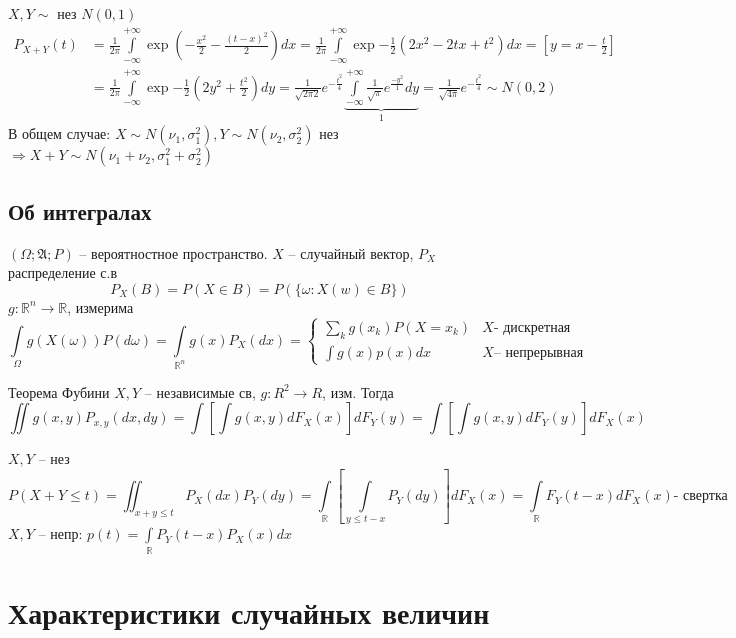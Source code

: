 \documentclass{article}
\newcommand{\A}{{\mathfrak A}}
\begin{document}
    \begin{example}
        $X, Y \sim $ нез $N(0, 1)$
        \begin{align*}
        P_{X+Y}(t) &= \frac{1}{2\pi} \int\limits_{-\infty}^{+\infty} \exp{(-\frac{x^2}{2} - \frac{(t-x)^2}{2})}dx = \frac{1}{2\pi} \int\limits_{-\infty}^{+\infty} \exp{-\frac{1}{2}(2x^2 - 2tx + t^2)}dx= \left[y = x - \frac{t}{2}\right] \\ &=\frac{1}{2\pi} \int\limits_{-\infty}^{+\infty} \exp{-\frac{1}{2} (2y^2 + \frac{t^2}{2})}dy = \frac{1}{\sqrt {2\pi 2}} e^{-\frac{t^2}{4}}  \underbrace{\int\limits_{-\infty}^{+\infty} \frac{1}{\sqrt\pi} e^\frac{-y ^2}{1} dy}_1 =\frac{1}{\sqrt {4\pi}} e^{-\frac{t^2}{4}} \sim N(0, 2)
        \end{align*}
        В общем случае:
        $X \sim N(\nu_1, \sigma_1^2), Y \sim N(\nu_2, \sigma_2^2)$ нез $ \Rightarrow X+Y \sim N(\nu_1 + \nu_2, \sigma_1^2+\sigma_2^2)$
    \end{example}

    \subsection{Об интегралах}
    $(\Omega;\A;P)$ -- вероятностное пространство.
    $X$ -- случайный вектор, $P_X$ распределение с.в
    $$ P_X(B) = P(X \in B) = P(\{\omega: X(w) \in B\})$$
    $g: \mathbb{R}^n \to \mathbb{R} $,  измерима
    $$ \int\limits_\Omega g(X(\omega)) P(d\omega) = \int\limits_{\mathbb{R}^n} g(x) P_X(dx) = 
        \begin{cases}
            \sum\limits_k g(x_k) P(X=x_k) & X \text{- дискретная} \\
            \int g(x) p(x) dx & X \text{-- непрерывная} 
        \end{cases}
    $$
    \begin{theorem}{Теорема Фубини}
    $X, Y$ -- независимые св, $g: R^2 \to R$, изм. Тогда
    $$\iint g(x, y) P_{x, y} (dx, dy) = \int \left[ \int g(x,y) dF_X(x) \right] dF_Y(y) = \int \left[ \int g(x,y) dF_Y(y) \right] dF_X(x)$$
    \end{theorem}
    \begin{example}
        $X, Y$ -- нез
        $$ P(X+Y \le t) = \iint_{x+y\le t} P_X(dx) P_Y(dy) = \int\limits_\mathbb{R} \left[
        \int\limits_{y \le t-x} P_Y(dy) \right] dF_X(x) = \int\limits_\mathbb{R} F_Y (t-x) dF_X(x) \text{- свертка}$$
        $X, Y$ -- непр: $p(t) = \int\limits_\mathbb{R} P_Y(t-x) P_X(x) dx$
    \end{example}
\section{Характеристики случайных величин}
\end{document}
